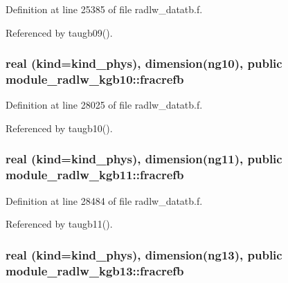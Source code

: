 Definition at line 25385 of file radlw\+\_\+datatb.\+f.



Referenced by taugb09().

\subsubsection[{\texorpdfstring{fracrefb}{fracrefb}}]{\setlength{\rightskip}{0pt plus 5cm}real (kind=kind\+\_\+phys), dimension(ng10), public module\+\_\+radlw\+\_\+kgb10\+::fracrefb}\hypertarget{group__module__radlw__main_ga07d5bac00d30f1ab873a0542b28d7e83}{}\label{group__module__radlw__main_ga07d5bac00d30f1ab873a0542b28d7e83}


Definition at line 28025 of file radlw\+\_\+datatb.\+f.



Referenced by taugb10().

\subsubsection[{\texorpdfstring{fracrefb}{fracrefb}}]{\setlength{\rightskip}{0pt plus 5cm}real (kind=kind\+\_\+phys), dimension(ng11), public module\+\_\+radlw\+\_\+kgb11\+::fracrefb}\hypertarget{group__module__radlw__main_ga0a89a2686ebc70a2c0d8577b89384a56}{}\label{group__module__radlw__main_ga0a89a2686ebc70a2c0d8577b89384a56}


Definition at line 28484 of file radlw\+\_\+datatb.\+f.



Referenced by taugb11().

\subsubsection[{\texorpdfstring{fracrefb}{fracrefb}}]{\setlength{\rightskip}{0pt plus 5cm}real (kind=kind\+\_\+phys), dimension(ng13), public module\+\_\+radlw\+\_\+kgb13\+::fracrefb}\hypertarget{group__module__radlw__main_ga92d45aee9dab62549ea8821eae7422dd}{}\label{group__module__radlw__main_ga92d45aee9dab62549ea8821eae7422dd}



